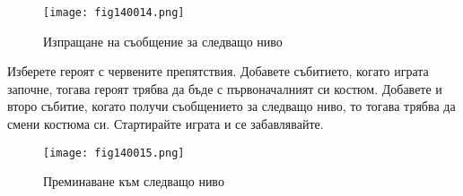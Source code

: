 \begin{figure}[H]
  \centering
  \texttt{[image: fig140014.png]}
  \caption{Изпращане на съобщение за следващо ниво}
\label{fig140014}
\end{figure}

Изберете героят с червените препятствия. Добавете събитието, когато играта започне, тогава героят трябва да бъде с първоначалният си костюм. Добавете и второ събитие, когато получи съобщението за следващо ниво, то тогава трябва да смени костюма си. Стартирайте играта и се забавлявайте.

\begin{figure}[H]
  \centering
  \texttt{[image: fig140015.png]}
  \caption{Преминаване към следващо ниво}
\label{fig140015}
\end{figure}
